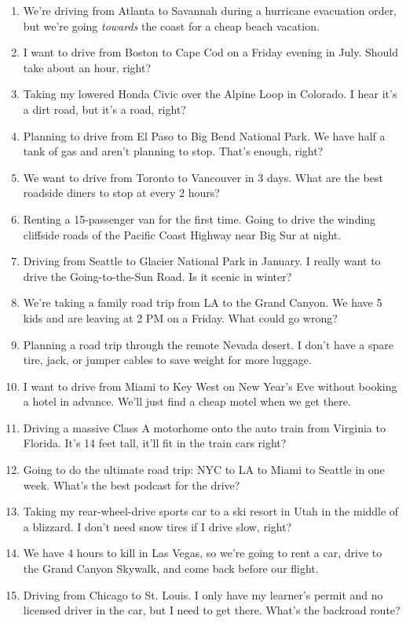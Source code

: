 \documentclass[12pt]{article}
\begin{document}
\begin{enumerate}
    \item We're driving from Atlanta to Savannah during a hurricane evacuation order, but we're going \textit{towards} the coast for a cheap beach vacation.
    \item I want to drive from Boston to Cape Cod on a Friday evening in July. Should take about an hour, right?
    \item Taking my lowered Honda Civic over the Alpine Loop in Colorado. I hear it's a dirt road, but it's a road, right?
    \item Planning to drive from El Paso to Big Bend National Park. We have half a tank of gas and aren't planning to stop. That's enough, right?
    \item We want to drive from Toronto to Vancouver in 3 days. What are the best roadside diners to stop at every 2 hours?
    \item Renting a 15-passenger van for the first time. Going to drive the winding cliffside roads of the Pacific Coast Highway near Big Sur at night.
    \item Driving from Seattle to Glacier National Park in January. I really want to drive the Going-to-the-Sun Road. Is it scenic in winter?
    \item We're taking a family road trip from LA to the Grand Canyon. We have 5 kids and are leaving at 2 PM on a Friday. What could go wrong?
    \item Planning a road trip through the remote Nevada desert. I don't have a spare tire, jack, or jumper cables to save weight for more luggage.
    \item I want to drive from Miami to Key West on New Year's Eve without booking a hotel in advance. We'll just find a cheap motel when we get there.
    \item Driving a massive Class A motorhome onto the auto train from Virginia to Florida. It's 14 feet tall, it'll fit in the train cars right?
    \item Going to do the ultimate road trip: NYC to LA to Miami to Seattle in one week. What's the best podcast for the drive?
    \item Taking my rear-wheel-drive sports car to a ski resort in Utah in the middle of a blizzard. I don't need snow tires if I drive slow, right?
    \item We have 4 hours to kill in Las Vegas, so we're going to rent a car, drive to the Grand Canyon Skywalk, and come back before our flight.
    \item Driving from Chicago to St. Louis. I only have my learner's permit and no licensed driver in the car, but I need to get there. What's the backroad route?

\end{enumerate}
\end{document}
